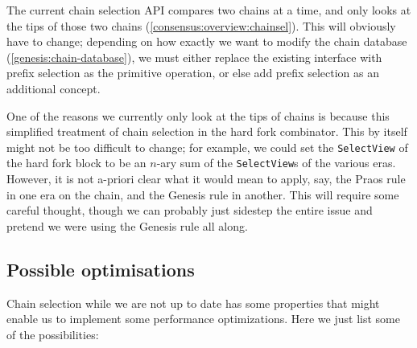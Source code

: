The current chain selection API compares two chains at a time, and only looks at
the tips of those two chains (\cref{consensus:overview:chainsel}). This will
obviously have to change; depending on how exactly we want to modify the chain
database (\cref{genesis:chain-database}), we must either replace the existing
interface with prefix selection as the primitive operation, or else add prefix
selection as an additional concept.

One of the reasons we currently only look at the tips of chains is because this
simplified treatment of chain selection in the hard fork combinator. This by
itself might not be too difficult to change; for example, we could set the
\lstinline!SelectView! of the hard fork block to be an $n$-ary sum of the
\lstinline!SelectView!s of the various eras. However, it is not a-priori clear
what it would mean to apply, say, the Praos rule in one era on the chain,
and the Genesis rule in another. This will require some careful thought,
though we can probably just sidestep the entire issue and pretend we were
using the Genesis rule all along.

\subsection{Possible optimisations}
\label{genesis:optimizations}

Chain selection while we are not up to date has some properties that might
enable us to implement some performance optimizations. Here we just list some of
the possibilities:


